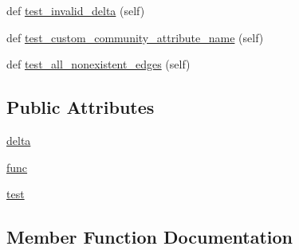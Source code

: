 \begin{DoxyCompactItemize}
\item 
def \hyperlink{classnetworkx_1_1algorithms_1_1tests_1_1test__link__prediction_1_1TestWithinInterCluster_a282b9e25f74c2a5c4c8f0110ca822443}{test\+\_\+invalid\+\_\+delta} (self)
\item 
def \hyperlink{classnetworkx_1_1algorithms_1_1tests_1_1test__link__prediction_1_1TestWithinInterCluster_a506c714981301653f127f5e6536493df}{test\+\_\+custom\+\_\+community\+\_\+attribute\+\_\+name} (self)
\item 
def \hyperlink{classnetworkx_1_1algorithms_1_1tests_1_1test__link__prediction_1_1TestWithinInterCluster_a6f6791575feb053294fb19af7417cf68}{test\+\_\+all\+\_\+nonexistent\+\_\+edges} (self)
\end{DoxyCompactItemize}
\subsection*{Public Attributes}
\begin{DoxyCompactItemize}
\item 
\hyperlink{classnetworkx_1_1algorithms_1_1tests_1_1test__link__prediction_1_1TestWithinInterCluster_a2eca66a6c8ebf862acb1180f8d809b43}{delta}
\item 
\hyperlink{classnetworkx_1_1algorithms_1_1tests_1_1test__link__prediction_1_1TestWithinInterCluster_a77051e5d61656d302fb9e3fb456bc8d9}{func}
\item 
\hyperlink{classnetworkx_1_1algorithms_1_1tests_1_1test__link__prediction_1_1TestWithinInterCluster_a3be7d3d9340f738f16f9ff71250ccf47}{test}
\end{DoxyCompactItemize}


\subsection{Member Function Documentation}
\mbox{\label{classnetworkx_1_1algorithms_1_1tests_1_1test__link__prediction_1_1TestWithinInterCluster_a472012115bdd18f3fa8d250c8dc58559}} 
